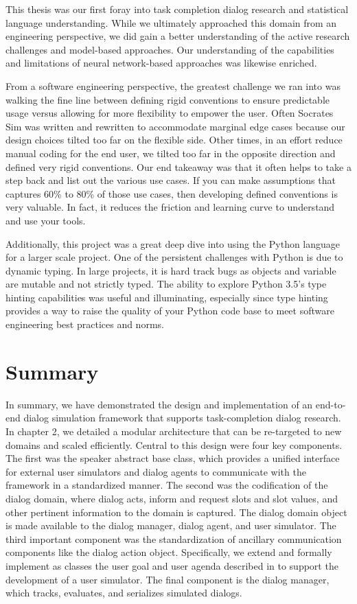 This thesis was our first foray into task completion dialog research and statistical language understanding. While we ultimately approached this domain from an engineering perspective, we did gain a better understanding of the active research challenges and model-based approaches. Our understanding of the capabilities and limitations of neural network-based approaches was likewise enriched. 

From a software engineering perspective, the greatest challenge we ran into was walking the fine line between defining rigid conventions to ensure predictable usage versus allowing for more flexibility to empower the user. Often Socrates Sim was written and rewritten to accommodate marginal edge cases because our design choices tilted too far on the flexible side. Other times, in an effort reduce  manual coding for the end user, we tilted too far in the opposite direction and defined very rigid conventions. Our end takeaway was that it often helps to take a step back and list out the various use cases. If you can make assumptions that captures 60\% to 80\% of those use cases, then developing defined conventions is very valuable. In fact, it reduces the friction and learning curve to understand and use your tools.

Additionally, this project was a great deep dive into using the Python language for a larger scale project. One of the persistent challenges with Python is due to dynamic typing. In large projects, it is hard track bugs as objects and variable are mutable and not strictly typed. The ability to explore Python 3.5's type hinting capabilities was useful and illuminating, especially since type hinting provides a way to raise the quality of your Python code base to meet software engineering best practices and norms.

\section{Summary}

In summary, we have demonstrated the design and implementation of an end-to-end dialog simulation framework that supports task-completion dialog research. In chapter 2, we detailed a modular architecture that can be re-targeted to new domains and scaled efficiently. Central to this design were four key components. The first was the speaker abstract base class, which provides a unified interface for external user simulators and dialog agents to communicate with the framework in a standardized manner. The second was the codification of the dialog domain, where dialog acts, inform and request slots and slot values, and other pertinent information to the domain is captured. The dialog domain object is made available to the dialog manager, dialog agent, and user simulator. The third important component was the standardization of ancillary communication components like the dialog action object. Specifically, we extend and formally implement as classes the user goal and user agenda described in \cite{Schatzmann2009TheHA} to support the development of a user simulator. The final component is the dialog manager, which tracks, evaluates, and serializes simulated dialogs. 

